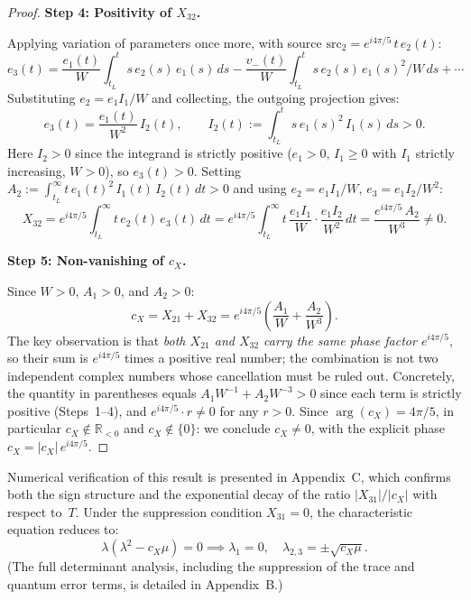 \documentclass[12pt,a4paper]{amsart}
\theoremstyle{remark}
\begin{document}
\begin{proof}
\medskip
\noindent\textbf{Step 4: Positivity of $X_{32}$.}

Applying variation of parameters once more, with source
$\mathrm{src}_2 = e^{i4\pi/5}\,t\,e_2(t)$:
\[
  e_3(t) = \frac{e_1(t)}{W}\int_{t_L}^t s\,e_2(s)\,e_1(s)\,ds
          - \frac{v_-(t)}{W}\int_{t_L}^t s\,e_2(s)\,e_1(s)^2/W\,ds + \cdots
\]
Substituting $e_2 = e_1 I_1/W$ and collecting, the outgoing projection gives:
\[
  e_3(t) = \frac{e_1(t)}{W^2}\,I_2(t), \qquad
  I_2(t) := \int_{t_L}^t s\,e_1(s)^2\,I_1(s)\,ds > 0.
\]
Here $I_2 > 0$ since the integrand is strictly positive ($e_1 > 0$, $I_1 \geq 0$
with $I_1$ strictly increasing, $W > 0$), so $e_3(t) > 0$.
Setting $A_2 := \int_{t_L}^\infty t\,e_1(t)^2\,I_1(t)\,I_2(t)\,dt > 0$
and using $e_2 = e_1 I_1/W$, $e_3 = e_1 I_2/W^2$:
\[
  X_{32} = e^{i4\pi/5}\int_{t_L}^\infty t\,e_2(t)\,e_3(t)\,dt
         = e^{i4\pi/5}\int_{t_L}^\infty t\,\frac{e_1 I_1}{W}\cdot\frac{e_1 I_2}{W^2}\,dt
         = \frac{e^{i4\pi/5}\,A_2}{W^3} \neq 0.
\]

\medskip
\noindent\textbf{Step 5: Non-vanishing of $c_X$.}

Since $W > 0$, $A_1 > 0$, and $A_2 > 0$:
\[
  c_X = X_{21} + X_{32}
      = e^{i4\pi/5}\!\left(\frac{A_1}{W} + \frac{A_2}{W^3}\right).
\]
The key observation is that \emph{both $X_{21}$ and $X_{32}$ carry
the same phase factor $e^{i4\pi/5}$}, so their sum is
$e^{i4\pi/5}$ times a positive real number; the combination is
not two independent complex numbers whose cancellation must be
ruled out.  Concretely, the quantity in parentheses equals
$A_1 W^{-1} + A_2 W^{-3} > 0$ since each term is strictly
positive (Steps~1--4), and $e^{i4\pi/5} \cdot r \neq 0$ for
any $r > 0$.  Since $\arg(c_X) = 4\pi/5$, in particular
$c_X \notin \mathbb{R}_{<0}$ and $c_X \notin \{0\}$:
we conclude $c_X \neq 0$, with the explicit phase
$c_X = |c_X|\,e^{i4\pi/5}$.
\end{proof}

Numerical verification of this result is presented in Appendix~C, which confirms both the sign
structure and the exponential decay of the ratio $|X_{31}|/|c_X|$ with respect to~$T$.
Under the suppression condition $X_{31} = 0$, the characteristic equation reduces to:
\[
  \lambda(\lambda^2 - c_X \mu) = 0
  \implies \lambda_1 = 0,\quad \lambda_{2,3} = \pm\sqrt{c_X \mu}.
\]
(The full determinant analysis, including the suppression of the trace and quantum error terms,
is detailed in Appendix~B.)
\end{document}
